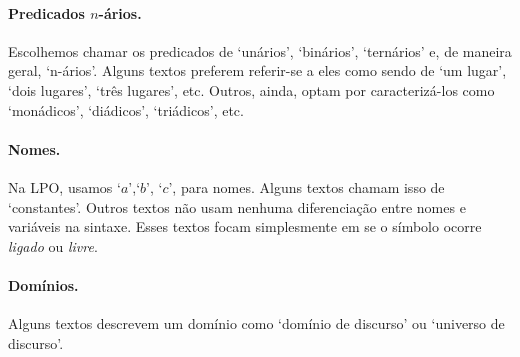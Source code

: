 \paragraph{Predicados $n$-ários.} Escolhemos chamar os predicados de `unários', `binários', `ternários' e, de maneira geral, `n-ários'. Alguns textos preferem referir-se a eles como sendo de `um lugar', `dois lugares', `três lugares', etc. Outros, ainda, optam por caracterizá-los como `monádicos', `diádicos', `triádicos', etc.

\paragraph{Nomes.} Na LPO, usamos `$a$',`$b$', `$c$', para nomes. Alguns textos chamam isso de `constantes'. Outros textos não usam nenhuma diferenciação entre nomes e variáveis na sintaxe. Esses textos focam simplesmente em se o símbolo ocorre \emph{ligado} ou \emph{livre}.

\paragraph{Domínios.} Alguns textos descrevem um domínio como `domínio de discurso' ou `universo de discurso'.

